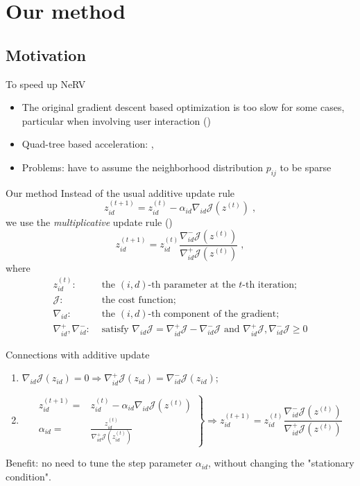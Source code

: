 \documentclass[first=dgreen,second=purple,logo=yellowexc]{aaltoslides}
\begin{document}
\section{Our method}
\subsection{Motivation}
\begin{frame}{To speed up NeRV}
\begin{itemize}
\item The original gradient descent based optimization is too slow for some cases, particular when involving user interaction (\cite{peltonen13eurovis})
\item Quad-tree based acceleration: \cite{yang13icml}, \cite{vandermaaten13iclr}
\item Problems: have to assume the neighborhood distribution $p_{ij}$ to be sparse
\end{itemize}
\end{frame}

\begin{frame}{Our method}
Instead of the usual additive update rule
\[
z^{(t+1)}_{id}=z^{(t)}_{id}-\alpha_{id} \nabla_{id} \mathcal{J}(z^{(t)})\;,
\]
we use the \emph{multiplicative} update rule (\cite{yang10mlsp})
\[
z^{(t+1)}_{id}=z^{(t)}_{id}\frac{\nabla^-_{id} \mathcal{J}(z^{(t)})}{\nabla^+_{id} \mathcal{J}(z^{(t)})}\;,
\]
where
\begin{align*}
z^{(t)}_{id}:&\mbox{ the $(i,d)$-th parameter at the $t$-th iteration;}\\
\mathcal{J}:&\mbox{ the cost function;}\\
\nabla_{id}:&\mbox{ the $(i,d)$-th component of the gradient;}\\
\nabla_{id}^+,\nabla_{id}^-:&\mbox{ satisfy }\nabla_{id}\mathcal{J}=\nabla_{id}^+\mathcal{J}-\nabla_{id}^-\mathcal{J}\mbox{ and }\nabla_{id}^+\mathcal{J},\nabla_{id}^-\mathcal{J}\ge 0
\end{align*}
\end{frame}

\begin{frame}{Connections with additive update}
\begin{enumerate}
\item $\nabla_{id}\mathcal{J}(z_{id})=0 \Longrightarrow \nabla_{id}^+\mathcal{J}(z_{id})=\nabla_{id}^-\mathcal{J}(z_{id})$;
\item
\[
\left.
\begin{aligned}
z^{(t+1)}_{id} =& z^{(t)}_{id}-\alpha_{id} \nabla_{id} \mathcal{J}(z^{(t)})\\
\alpha_{id} =& \frac{z_{id}^{(t)}}{\nabla_{id}^+\mathcal{J}(z_{id}^{(t)})}
\end{aligned}
\right\}\Longrightarrow z^{(t+1)}_{id}=z^{(t)}_{id}\frac{\nabla^-_{id} \mathcal{J}(z^{(t)})}{\nabla^+_{id} \mathcal{J}(z^{(t)})}
\]
\end{enumerate}
Benefit: no need to tune the step parameter $\alpha_{id}$, without changing the "stationary condition".
\end{frame}
\end{document}
